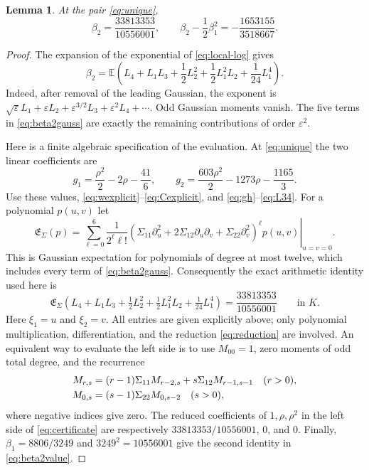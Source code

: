 \documentclass[11pt,reqno]{amsart}
\newcommand{\EE}{\mathbb E}
\newtheorem{lemma}[theorem]{Lemma}
\theoremstyle{remark}
\numberwithin{equation}{section}
\begin{document}
\begin{lemma}\label{lem:second}
At the pair \eqref{eq:unique},
\begin{equation}\label{eq:beta2value}
 \beta_2=\frac{33813353}{10556001},\qquad
 \beta_2-\frac12\beta_1^2=-\frac{1653155}{3518667}.
\end{equation}
\end{lemma}
\begin{proof}
The expansion of the exponential of \eqref{eq:local-log} gives
\begin{equation}\label{eq:beta2gauss}
 \beta_2=
 \EE\left(L_4+L_1L_3+\frac12L_2^2
                 +\frac12L_1^2L_2+\frac1{24}L_1^4\right).
\end{equation}
Indeed, after removal of the leading Gaussian, the exponent is
$\sqrt\varepsilon L_1+\varepsilon L_2+
\varepsilon^{3/2}L_3+\varepsilon^2L_4+\cdots$.
Odd Gaussian moments vanish. The five terms in
\eqref{eq:beta2gauss} are exactly the remaining contributions of
order $\varepsilon^2$.

Here is a finite algebraic specification of the evaluation.
At \eqref{eq:unique} the two linear coefficients are
\[
 g_1=\frac{\rho^2}{2}-2\rho-\frac{41}{6},\qquad
 g_2=\frac{603\rho^2}{2}-1273\rho-\frac{1165}{3}.
\]
Use these values, \eqref{eq:wexplicit}--\eqref{eq:Cexplicit}, and
\eqref{eq:gh}--\eqref{eq:L34}.
For a polynomial $p(u,v)$ let
\[
 \mathfrak E_\Sigma(p)=
 \left.
 \sum_{\ell=0}^{6}\frac1{2^\ell\ell!}
 \left(\Sigma_{11}\partial_u^2+
       2\Sigma_{12}\partial_u\partial_v+
       \Sigma_{22}\partial_v^2\right)^\ell p(u,v)
 \right|_{u=v=0}.
\]
This is Gaussian expectation for polynomials of degree at most twelve,
which includes every term of \eqref{eq:beta2gauss}.
Consequently the exact arithmetic identity used here is
\begin{equation}\label{eq:certificate}
 \mathfrak E_\Sigma\left(
 L_4+L_1L_3+\tfrac12L_2^2+
 \tfrac12L_1^2L_2+\tfrac1{24}L_1^4
 \right)
 =\frac{33813353}{10556001}\qquad\text{in }K.
\end{equation}
Here $\xi_1=u$ and $\xi_2=v$. All entries are given explicitly above; only polynomial
multiplication, differentiation, and the reduction
\eqref{eq:reduction} are involved. An equivalent way to evaluate the
left side is to use $M_{00}=1$, zero moments of odd total degree,
and the recurrence
\begin{align}
 M_{r,s}&=(r-1)\Sigma_{11}M_{r-2,s}
              +s\Sigma_{12}M_{r-1,s-1}\quad(r>0),\notag\\
 M_{0,s}&=(s-1)\Sigma_{22}M_{0,s-2}\quad(s>0),
 \label{eq:momentrecurrence}
\end{align}
where negative indices give zero.
The reduced coefficients of $1,\rho,\rho^2$ in the left side of
\eqref{eq:certificate} are respectively
$33813353/10556001$, $0$, and $0$.
Finally, $\beta_1=8806/3249$ and $3249^2=10556001$ give
the second identity in \eqref{eq:beta2value}.
\end{proof}
\end{document}
